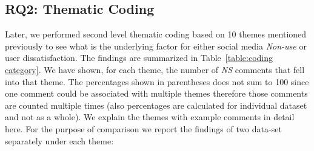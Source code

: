 \subsection{RQ2: Thematic Coding}
 Later, we performed second level thematic coding based on 10 themes mentioned previously to see what is the underlying factor for either social media \textit{Non-use} or user dissatisfaction. The findings are summarized in Table~\ref{table:coding category}. We have shown, for each theme, the number of \emph{NS} comments that fell into that theme. The percentages shown in parentheses does not sum to 100 since one comment could be associated with multiple themes therefore those comments are counted multiple times (also percentages are calculated for individual dataset and not as a whole). We explain the themes with example comments in detail here. For the purpose of comparison we report the findings of two data-set separately under each theme:
 
